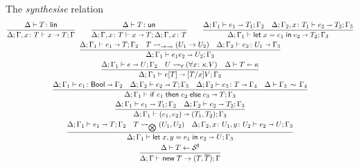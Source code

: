 \begin{figure}[h!]
  The \emph{synthesise} relation\hfill{}
  \begin{gather*}
    \frac{
      \isLin T
    }{
      \algtypeout[\kindEnv;\varEnv, x\colon T] x T \varEnv
    }
    \qquad
    \frac{
      \isUn T
    }{
      \algtypeout[\kindEnv;\varEnv, x\colon T] x T {\kindEnv;\varEnv, x\colon T}
    }
    \qquad
    \frac{
      \algtypeout[\kindEnv;\varEnv_1]{e_1}{T_1}{\varEnv_2}
      \quad
      \algtypeout[\kindEnv;\varEnv_2,x\colon T_1]{e_2}{T_2}{\Gamma_3}
    }{
      \algtypeout[\kindEnv;\varEnv_1]{\unlete{x}{e_1}{e_2}}{T_2}{\varEnv_3}
    }
    \\
    \frac{
      \algtypeout[\kindEnv;\varEnv_1]{e_1}{T}{\varEnv_2}
      \quad
      T \Extract{\rightarrow\multimap} (U_1\rightarrow U_2)
      \quad
      \algtypein[\kindEnv;\varEnv_2]{e_2}{U_1}{\varEnv_3}
    }{
      \algtypeout[\kindEnv;\varEnv_1]{e_1e_2}{U_2}{\varEnv_3}
    }
    \\
    \frac{
      \algtypeout[\kindEnv;\varEnv_1]{e}{U}{\varEnv_2}
      \quad
      U \Extract{\forall} (\forall x\colon\kind.V)
      \quad
      \algkindin T \kind
    }{
      \algtypeout[\kindEnv;\varEnv_1]{e[T]}{\subs T x V}{\varEnv_2}
    }
    \\
    \frac{
      \algtypein[\kindEnv;\varEnv_1]{e_1}{\boole}{\varEnv_2}
      \quad
      \algtypeout[\kindEnv;\varEnv_2]{e_2}{T}{\varEnv_3}
      \quad
      \algtypein[\kindEnv;\varEnv_2]{e_3}{T}{\varEnv_4}
      \quad
      \ctxequiv{\varEnv_3}{\varEnv_4}
    }{
      \algtypeout[\kindEnv;\varEnv_1]{\conditionale{e_1}{e_2}{e_3}}{T}{\varEnv_3}
    }
    \\
    \frac{
      \algtypeout[\kindEnv ; \varEnv_1]{e_1}{T_1}{\varEnv_2}
      \quad
      \algtypeout[\kindEnv ; \varEnv_2]{e_2}{T_2}{\varEnv_3}
    }{
      \algtypeout[\kindEnv ; \varEnv_1]{(e_1, e_2)}{(T_1,T_2)}{\varEnv_3}
    }
    \\
    \frac{
      \algtypeout[\kindEnv ; \varEnv_1]{e_1}{T}{\varEnv_2}
      \quad
      T \Extract{\bigotimes} (U_1, U_2)
      \quad
      \algtypeout[\kindEnv; \varEnv_2, x\colon U_1, y\colon U_2]{e_2}{U}{\varEnv_3}
    }{
      \algtypeout[\kindEnv;
      \varEnv_1]{\binlete{x}{y}{e_1}{e_2}}{U}{\varEnv_3}
    }
    \\
    \frac{
      \kindEnv \Alg T \leftarrow \kinds^{\Lin}
    }{
      \kindEnv;\varEnv \Alg \newe{T} \rightarrow (T, \dual{T}); \varEnv
}
\end{gather*}
\end{figure}
